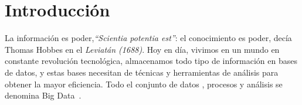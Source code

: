 \documentclass[a4paper, 12pt]{book}
\begin{document}




\tableofcontents 
\cleardoublepage
\listoffigures %
\cleardoublepage
\listoftables %
\cleardoublepage
\listoflistings


\cleardoublepage
\chapter{Introducción}
\label{sec:intro}
La información es poder,\textit{“Scientia potentia est”}:
el conocimiento es poder, decía Thomas Hobbes  en el \textit{Leviatán (1688)}. Hoy en día, vivimos en un mundo en constante revolución tecnológica, almacenamos todo tipo de información en bases de datos, y estas bases necesitan de técnicas y herramientas de análisis para obtener la mayor eficiencia.
Todo el conjunto de datos , procesos y análisis se denomina Big Data~\cite{mayer2013big}.
\end{document}
